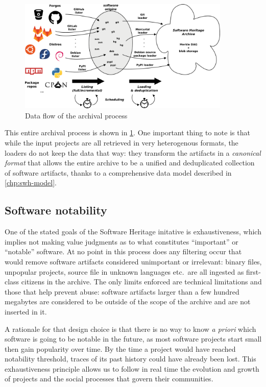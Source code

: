 \begin{figure}
\begin{center}
    \includegraphics[width=0.9\textwidth]{img/swh-dataflow}
\end{center}
\caption{Data flow of the archival process}%
\label{fig:archival-data-flow}
\end{figure}

This entire archival process is shown in \cref{fig:archival-data-flow}. One
important thing to note is that while the input projects are all retrieved in
very heterogenous formats, the loaders do not keep the data that way: they
transform the artifacts in a \emph{canonical format} that allows the entire
archive to be a unified and deduplicated collection of software artifacts,
thanks to a comprehensive data model described in \cref{chp:swh-model}.

\subsection{Software notability}

One of the stated goals of the Software Heritage initative is exhaustiveness,
which implies not making value judgments as to what constitutes ``important''
or ``notable'' software. At no point in this process does any filtering occur
that would remove software artifacts considered unimportant or irrelevant:
binary files, unpopular projects, source file in unknown languages etc.\ are
all ingested as first-class citizens in the archive. The only limits enforced
are technical limitations and those that help prevent abuse: software artifacts
larger than a few hundred megabytes are considered to be outside of the scope
of the archive and are not inserted in it.

A rationale for that design choice is that there is no way to know \emph{a
priori} which software is going to be notable in the future, as most software
projects start small then gain popularity over time. By the time a project
would have reached notability threshold, traces of its past history could have
already been lost. This exhaustiveness principle allows us to follow in real
time the evolution and growth of projects and the social processes that govern
their communities.


